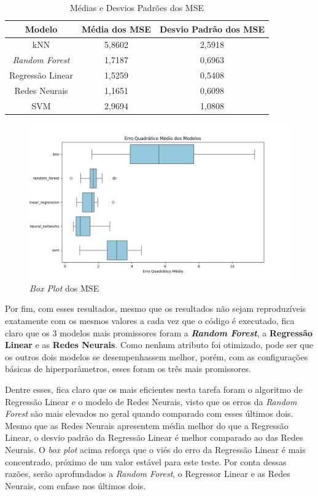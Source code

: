 \documentclass{report}
\begin{document}
\begin{table}[h!]
  \centering
  \begin{tabular}{| c | c | c |}
      \hline
      \rowcolor{lightgray}
      \textbf{Modelo} & \textbf{Média dos MSE} & \textbf{Desvio Padrão dos MSE} \\
      \hline
      kNN & 5,8602 & 2,5918 \\
      \hline
      \textit{Random Forest} & 1,7187 & 0,6963 \\
      \hline
      Regressão Linear & 1,5259 & 0,5408 \\
      \hline
      Redes Neurais & 1,1651 & 0,6098 \\
      \hline
      SVM & 2,9694 & 1,0808 \\
      \hline
  \end{tabular}
  \caption{\label{table:model_summary} Médias e Desvios Padrões dos MSE}
\end{table}

\begin{figure}[h!]
  \centering
  \includegraphics[width=.85\linewidth]{images/plots/box_plots/mse.png}
  \caption{\label{img:mse_boxplot} \textit{Box Plot} dos MSE}
\end{figure}

Por fim, com esses resultados, mesmo que os resultados não sejam reproduzíveis exatamente com os mesmos valores a cada vez que o código é executado, fica claro que os 3 modelos mais promissores foram
a \textbf{\textit{Random Forest}}, a \textbf{Regressão Linear} e as \textbf{Redes Neurais}. Como nenhum atributo foi otimizado, pode ser que os outros dois modelos se desempenhassem melhor, porém, com
as configurações básicas de hiperparâmetros, esses foram os três mais promissores.

Dentre esses, fica claro que os mais eficientes nesta tarefa foram o algoritmo de Regressão Linear e o modelo de Redes Neurais, visto que os erros da \textit{Random Forest} são mais elevados no geral quando
comparado com esses últimos dois. Mesmo que as Redes Neurais apresentem média melhor do que a Regressão Linear, o desvio padrão da Regressão Linear é melhor comparado ao das Redes Neurais. O \textit{box plot}
acima reforça que o viés do erro da Regressão Linear é mais concentrado, próximo de um valor estável para este teste. Por conta dessas razões, serão aprofundados a \textit{Random Forest}, o Regressor
Linear e as Redes Neurais, com enfase nos últimos dois.
\end{document}
